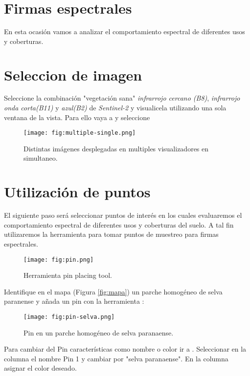\begin{enumerate}
\section{Firmas espectrales}


En esta ocasión vamos a analizar el comportamiento espectral de diferentes usos y coberturas. 

\section{Seleccion de imagen}

Seleccione la combinación "vegetación sana" \emph{infrarrojo cercano (B8)}, \emph{infrarrojo onda corta(B11)} y \emph{azul(B2)} de \emph{Sentinel-2} y visualicela utilizando una sola ventana de la vista. Para ello vaya a  y seleccione 

\begin{figure}[h!]
    \centering
    \texttt{[image: fig:multiple-single.png]}
    \caption{Distintas imágenes desplegadas en multiples visualizadores en simultaneo.}
    \label{fig:multiples}
\end{figure}

\section{Utilización de puntos}

El siguiente paso será seleccionar puntos de interés en los cuales evaluaremos el comportamiento espectral de diferentes usos y coberturas del suelo. A tal fin utilizaremos la herramienta  para tomar puntos de muestreo para firmas espectrales.

\begin{figure}[h!]
    \centering
    \texttt{[image: fig:pin.png]}
    \caption{Herramienta pin placing tool.}
    \label{fig:pin}
\end{figure}

Identifique en el mapa (Figura \ref{fig:mapa}) un parche homogéneo de selva paranense y añada un pin con la herramienta : 

\begin{figure}[h!]
    \centering
    \texttt{[image: fig:pin-selva.png]}
    \caption{Pin en un parche homogéneo de selva paranaense.}
    \label{fig:selva}
\end{figure}

Para cambiar del Pin características como nombre o color ir a  . Seleccionar en la columna  el nombre Pin 1 y cambiar por "selva paranaense". En la columna  asignar el color deseado. 


\end{enumerate}
